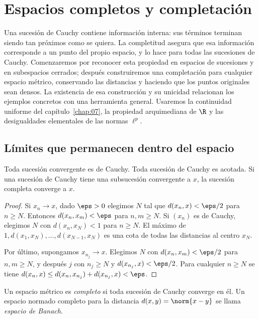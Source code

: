 \chapter{Espacios completos y completación}\label{cap:nuevo03}\label{chap:08}\label{chap:09}
Una sucesión de Cauchy contiene información interna: sus términos terminan siendo tan próximos como se quiera. La completitud asegura que esa información corresponde a un punto del propio espacio, y lo hace para todas las sucesiones de Cauchy. Comenzaremos por reconocer esta propiedad en espacios de sucesiones y en subespacios cerrados; después construiremos una completación para cualquier espacio métrico, conservando las distancias y haciendo que los puntos originales sean densos. La existencia de esa construcción y su unicidad relacionan los ejemplos concretos con una herramienta general. Usaremos la continuidad uniforme del capítulo~\ref{chap:07}, la propiedad arquimediana de $\R$ y las desigualdades elementales de las normas $\ell^p$.

\section{Límites que permanecen dentro del espacio}
\label{lectura:08}

\begin{proposicion}\label{ch08:cauchy-basico}
Toda sucesión convergente es de Cauchy. Toda sucesión de Cauchy es acotada. Si una sucesión de Cauchy tiene una subsucesión convergente a $x$, la sucesión completa converge a $x$.
\end{proposicion}
\begin{proof}
Si $x_n\to x$, dado $\eps>0$ elegimos $N$ tal que $d(x_n,x)<\eps/2$ para $n\geq N$. Entonces $d(x_n,x_m)<\eps$ para $n,m\geq N$. Si $(x_n)$ es de Cauchy, elegimos $N$ con $d(x_n,x_N)<1$ para $n\geq N$. El máximo de $1,d(x_1,x_N),\ldots,d(x_{N-1},x_N)$ es una cota de todas las distancias al centro $x_N$.

Por último, supongamos $x_{n_j}\to x$. Elegimos $N$ con $d(x_n,x_m)<\eps/2$ para $n,m\geq N$, y después $j$ con $n_j\geq N$ y $d(x_{n_j},x)<\eps/2$. Para cualquier $n\geq N$ se tiene $d(x_n,x)\leq d(x_n,x_{n_j})+d(x_{n_j},x)<\eps$.
\end{proof}

\begin{definicion}
Un espacio métrico es \emph{completo} si toda sucesión de Cauchy converge en él. Un espacio normado completo para la distancia $d(x,y)=\norm{x-y}$ se llama \emph{espacio de Banach}.
\end{definicion}

